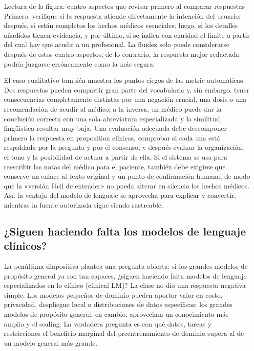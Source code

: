 \documentclass[a4paper]{article}
\begin{document}
\begin{knowledgebox}{Lectura de la figura: cuatro aspectos que revisar primero al comparar respuestas}
Primero, verifique si la respuesta atiende directamente la intención del usuario; después, si están completos los hechos médicos esenciales; luego, si los detalles añadidos tienen evidencia, y por último, si se indica con claridad el límite a partir del cual hay que acudir a un profesional. La fluidez solo puede considerarse después de estos cuatro aspectos; de lo contrario, la respuesta mejor redactada podría juzgarse erróneamente como la más segura.
\end{knowledgebox}

El caso cualitativo también muestra los puntos ciegos de las metric automáticas. Dos respuestas pueden compartir gran parte del vocabulario y, sin embargo, tener consecuencias completamente distintas por una negación crucial, una dosis o una recomendación de acudir al médico; a la inversa, un médico puede dar la conclusión correcta con una sola abreviatura especializada y la similitud lingüística resultar muy baja. Una evaluación adecuada debe descomponer primero la respuesta en proposition clínicas, comprobar si cada una está respaldada por la pregunta y por el consenso, y después evaluar la organización, el tono y la posibilidad de actuar a partir de ella. Si el sistema se usa para reescribir las notas del médico para el paciente, también debe exigirse que conserve un enlace al texto original y un punto de confirmación humana, de modo que la «versión fácil de entender» no pueda alterar en silencio los hechos médicos. Así, la ventaja del modelo de lenguaje se aprovecha para explicar y convertir, mientras la fuente autorizada sigue siendo rastreable.

\subsection{¿Siguen haciendo falta los modelos de lenguaje clínicos?}

La penúltima diapositiva plantea una pregunta abierta: si los grandes modelos de propósito general ya son tan capaces, ¿siguen haciendo falta modelos de lenguaje especializados en lo clínico (clinical LM)? La clase no dio una respuesta negativa simple. Los modelos pequeños de dominio pueden aportar valor en costo, privacidad, despliegue local o distribuciones de datos específicas; los grandes modelos de propósito general, en cambio, aprovechan un conocimiento más amplio y el scaling. La verdadera pregunta es con qué datos, tareas y restricciones el beneficio marginal del preentrenamiento de dominio supera al de un modelo general más grande.
\end{document}
